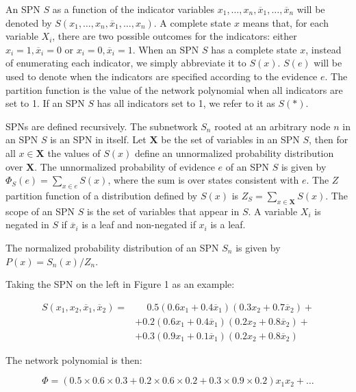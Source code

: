 \documentclass[a4paper,10pt]{article}
\theoremstyle{plain}
\begin{document}
An SPN $S$ as a function of the indicator variables $x_1,\ldots,x_n,\overline{x}_1,\ldots,
\overline{x}_n$ will be denoted by $S(x_1,\ldots,x_n,\overline{x}_1,\ldots,x_n)$. A complete state
$x$ means that, for each variable $X_i$, there are two possible outcomes for the indicators: either
$x_i=1,\overline{x}_i=0$ or $x_i=0,\overline{x}_i=1$. When an SPN $S$ has a complete state $x$,
instead of enumerating each indicator, we simply abbreviate it to $S(x)$. $S(e)$ will be used to
denote when the indicators are specified according to the evidence $e$. The partition function is
the value of the network polynomial when all indicators are set to 1. If an SPN $S$ has all
indicators set to 1, we refer to it as $S(*)$.

SPNs are defined recursively. The subnetwork $S_n$ rooted at an arbitrary node $n$ in an SPN $S$
is an SPN in itself. Let $\mathbf{X}$ be the set of variables in an SPN $S$, then for all $x\in
\mathbf{X}$ the values of $S(x)$ define an unnormalized probability distribution over $\mathbf{X}$.
The unnormalized probability of evidence $e$ of an SPN $S$ is given by $\Phi_S(e)=\sum_{x\in e}
S(x)$, where the sum is over states consistent with $e$. The $Z$ partition function of a
distribution defined by $S(x)$ is $Z_S=\sum_{x\in \mathbf{X}}S(x)$. The scope of an SPN $S$ is the
set of variables that appear in $S$. A variable $X_i$ is negated in $S$ if $\overline{x}_i$ is a
leaf and non-negated if $x_i$ is a leaf.

The normalized probability distribution of an SPN $S_n$ is given by $P(x)=S_n(x)/Z_n$.

Taking the SPN on the left in Figure 1 as an example:

\begin{align*}
  S(x_1,x_2,\overline{x}_1,\overline{x}_2)=&\phantom{{} +{}}0.5(0.6x_1+0.4\overline{x}_1)(0.3x_2+0.7\overline{x}_2)+\\
                                           &+0.2(0.6x_1+0.4\overline{x}_1)(0.2x_2+0.8\overline{x}_2)+\\
                                           &+0.3(0.9x_1+0.1\overline{x}_1)(0.2x_2+0.8\overline{x}_2)
\end{align*}

The network polynomial is then:

\begin{equation*}
  \Phi = (0.5\times0.6\times0.3+0.2\times0.6\times0.2+0.3\times0.9\times0.2)x_1x_2+\ldots
\end{equation*}
\end{document}
